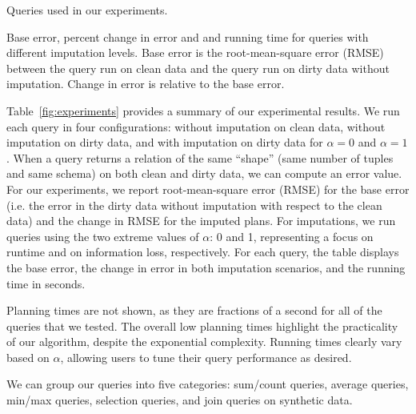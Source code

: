 
\begin{table*}
  \centerfloat
  
  \caption{Queries used in our experiments.}
  \label{fig:queries}
\end{table*}

\begin{table}
  \centerfloat
  
    \caption{Base error, percent change in error and and running time for queries
    with different imputation levels. Base error is the root-mean-square error (RMSE) between the query run on clean
    data and the query run on dirty data without imputation. Change in error is relative to the base error.}
  \label{fig:experiments}
\end{table}

Table~\ref{fig:experiments} provides a summary of our experimental results.
We run each query in four configurations: without imputation on clean data, without imputation on dirty data, and with imputation on dirty data for $\alpha = 0$ and $\alpha = 1$.
When a query returns a relation of the same ``shape'' (same number of tuples and same schema) on both clean and dirty data, we can compute an error value.
For our experiments, we report root-mean-square error (RMSE) for the base error (i.e. the error in the dirty data without imputation with respect to the clean data) and the change
in RMSE for the imputed plans.
For imputations, we run queries using the two extreme values of $\alpha$: 0 and 1, representing a focus on runtime and on information loss, respectively.
For each query, the table displays the base error, the change in error in both imputation scenarios, and the running time in seconds.

Planning times are not shown, as they are fractions of a second for all of the queries that we tested.
The overall low planning times highlight the practicality of our algorithm, despite the exponential complexity.
Running times clearly vary based on $\alpha$, allowing users to tune their query performance as desired.

We can group our queries into five categories: sum/count queries, average queries, min/max queries, selection queries, and join queries on synthetic data.

